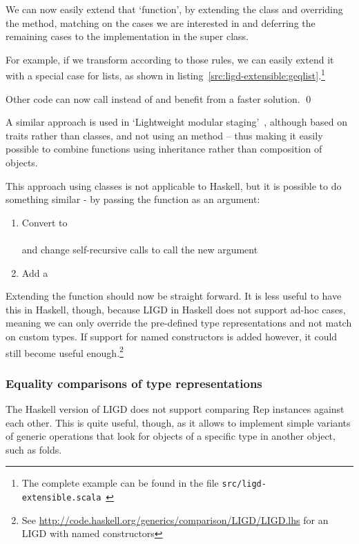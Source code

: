 We can now easily extend that `function', by extending the class and overriding
the  method, matching on the cases we are interested in and deferring the
remaining cases to the implementation in the super class.

\begin{example}
For example, if we transform  according to those rules, we can
easily extend it with a special case for lists, as shown in listing~\ref{src:ligd-extensible:geqlist}.\footnote{The complete example can be found in
the  file \texttt{src/ligd-extensible.scala}~\cite{src}}

Other code can now call  instead of  and benefit from a
faster solution. \qed
\end{example}
A similar approach is used in `Lightweight modular staging'~\cite{DBLP:conf/gpce/RompfO10},
although based on traits rather than classes, and not using an 
method -- thus making it easily possible to combine functions using inheritance
rather than composition of objects.

This approach using classes is not applicable to Haskell, but it is possible
to do something similar - by passing the function as an argument:
\begin{enumerate}
  \item Convert  to \\
        \hphantom{Convert } \\
        and change self-recursive calls to call the new argument
  \item Add a  
\end{enumerate}

Extending the function should now be straight forward. It is less useful to
have this in Haskell, though, because LIGD in Haskell does not support ad-hoc
cases, meaning we can only override the pre-defined type representations and not
match on custom types. If support for named constructors is added however, it
could still become useful enough.\footnote{See \url{http://code.haskell.org/generics/comparison/LIGD/LIGD.lhs} for an LIGD with named constructors}

\subsubsection{Equality comparisons of type representations}
The Haskell version of LIGD does not support comparing Rep instances
against each other. This is quite useful, though, as it allows to
implement simple variants of generic operations that look for objects
of a specific type in another object, such as folds.

